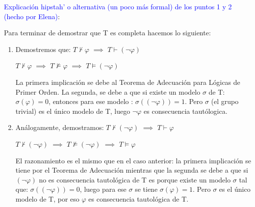 \begin{problem}
\textcolor{blue}{Explicación hipstah' o alternativa (un poco más formal) de los puntos 1 y 2 (hecho por Elena)}:

Para terminar de demostrar que T es completa hacemos lo siguiente:
\begin{enumerate}

\item Demostremos que: $T \nvdash \varphi $ $\implies$ $T \vdash (\neg \varphi)$ 

$T \nvdash \varphi $ $\implies$ $T \nvDash \varphi $ $\implies$ $T \vDash (\neg \varphi)$

La primera implicación se debe al Teorema de Adecuación para Lógicas de Primer Orden. La segunda, se debe a que si existe un modelo $\sigma$ de T: $\sigma(\varphi) = 0$, entonces para ese modelo : $\sigma((\neg \varphi)) = 1$. Pero $\sigma$ (el grupo trivial) es el único modelo de T, luego $\neg \varphi$ es consecuencia tautólogica.

\item Análogamente, demostramos: $T \nvdash (\neg \varphi) $ $\implies$ $T \vdash \varphi$

$T \nvdash (\neg\varphi) $ $\implies$ $T \nvDash (\neg \varphi) $ $\implies$ $T \vDash  \varphi$

El razonamiento es el mismo que en el caso anterior: la primera implicación se tiene por el Teorema de Adecuación mientras que la segunda se debe a que si $(\neg \varphi)$ no es consecuencia tautológica de T es porque existe un modelo $\sigma$ tal que: $\sigma((\neg \varphi)) = 0$, luego para ese $\sigma$ se tiene $\sigma(\varphi)=1$. Pero $\sigma$ es el único modelo de T, por eso $\varphi$ es consecuencia tautológica de T. 
\end{enumerate}

\end{problem}

